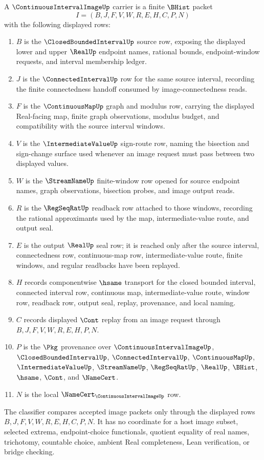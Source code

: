 \begin{definition}
\label{def:continuous-interval-image-carrier}
A $\ContinuousIntervalImageUp$ carrier is a finite $\BHist$ packet
$$
I=(B,J,F,V,W,R,E,H,C,P,N)
$$
with the following displayed rows:
\begin{enumerate}
\item $B$ is the $\ClosedBoundedIntervalUp$ source row, exposing the displayed lower and upper $\RealUp$ endpoint names, rational bounds, endpoint-window requests, and interval membership ledger.
\item $J$ is the $\ConnectedIntervalUp$ row for the same source interval, recording the finite connectedness handoff consumed by image-connectedness reads.
\item $F$ is the $\ContinuousMapUp$ graph and modulus row, carrying the displayed Real-facing map, finite graph observations, modulus budget, and compatibility with the source interval windows.
\item $V$ is the $\IntermediateValueUp$ sign-route row, naming the bisection and sign-change surface used whenever an image request must pass between two displayed values.
\item $W$ is the $\StreamNameUp$ finite-window row opened for source endpoint names, graph observations, bisection probes, and image output reads.
\item $R$ is the $\RegSeqRatUp$ readback row attached to those windows, recording the rational approximants used by the map, intermediate-value route, and output seal.
\item $E$ is the output $\RealUp$ seal row; it is reached only after the source interval, connectedness row, continuous-map row, intermediate-value route, finite windows, and regular readbacks have been replayed.
\item $H$ records componentwise $\hsame$ transport for the closed bounded interval, connected interval row, continuous map, intermediate-value route, window row, readback row, output seal, replay, provenance, and local naming.
\item $C$ records displayed $\Cont$ replay from an image request through $B,J,F,V,W,R,E,H,P,N$.
\item $P$ is the $\Pkg$ provenance over $\ContinuousIntervalImageUp$, $\ClosedBoundedIntervalUp$, $\ConnectedIntervalUp$, $\ContinuousMapUp$, $\IntermediateValueUp$, $\StreamNameUp$, $\RegSeqRatUp$, $\RealUp$, $\BHist$, $\hsame$, $\Cont$, and $\NameCert$.
\item $N$ is the local $\NameCert_{\ContinuousIntervalImageUp}$ row.
\end{enumerate}
The classifier compares accepted image packets only through the displayed rows $B,J,F,V,W,R,E,H,C,P,N$. It has no coordinate for a host image subset, selected extrema, endpoint-choice functionals, quotient equality of real names, trichotomy, countable choice, ambient Real completeness, Lean verification, or bridge checking.
\end{definition}

